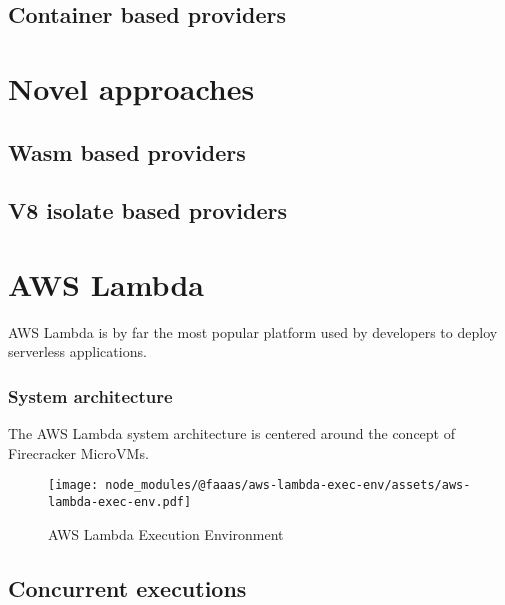 \subsection{Container based providers}

\section{Novel \faas{} approaches}
\subsection{Wasm based providers}

\subsection{V8 isolate based providers}

\section{AWS Lambda}

AWS Lambda is by far the most popular\cite{eismannReviewServerlessUse2020,StateServerlessDatadog} \faas{} platform used by developers to deploy serverless applications.

\subsubsection{System architecture}

The AWS Lambda system architecture is centered around the concept of Firecracker MicroVMs\cite{agacheFirecrackerLightweightVirtualization2020}.

\begin{figure*}[t]
    \texttt{[image: node\_modules/@faaas/aws-lambda-exec-env/assets/aws-lambda-exec-env.pdf]}
    \caption{AWS Lambda Execution Environment}
    \label{fig:aws-lambda-exec-env}
\end{figure*}

\subsection{Concurrent executions}

